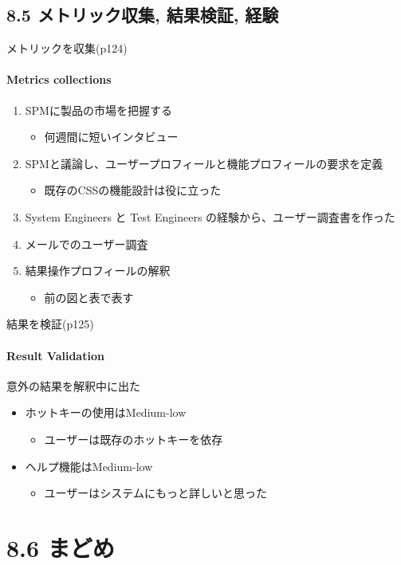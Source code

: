 \subsection{8.5 メトリック収集, 結果検証, 経験}
\begin{frame}{メトリックを収集(p124)}
\framesubtitle{Metrics collections}
\begin{enumerate}
\item SPMに製品の市場を把握する
    \begin{itemize}
    \item 何週間に短いインタビュー
    \end{itemize}
\item SPMと議論し、ユーザープロフィールと機能プロフィールの要求を定義
    \begin{itemize}
    \item 既存のCSSの機能設計は役に立った
    \end{itemize}
\item System Engineers と Test Engineers の経験から、ユーザー調査書を作った
\item メールでのユーザー調査
\item 結果操作プロフィールの解釈
    \begin{itemize}
    \item 前の図と表で表す
    \end{itemize}
\end{enumerate}
\end{frame}

\begin{frame}{結果を検証(p125)}
\framesubtitle{Result Validation}
意外の結果を解釈中に出た
\begin{itemize}
\item ホットキーの使用はMedium-low
    \begin{itemize}
    \item ユーザーは既存のホットキーを依存
    \end{itemize}
\item ヘルプ機能はMedium-low
    \begin{itemize}
    \item ユーザーはシステムにもっと詳しいと思った
    \end{itemize}
\end{itemize}
\end{frame}
\section{8.6 まどめ}
